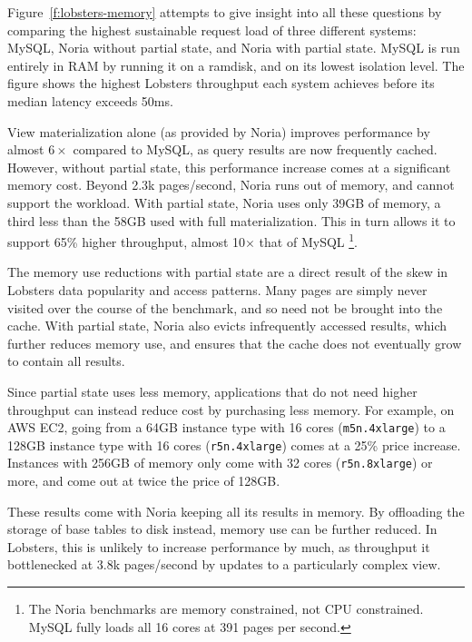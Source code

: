 Figure~\ref{f:lobsters-memory} attempts to give insight into all these questions
by comparing the highest sustainable request load of three different systems:
MySQL, Noria without partial state, and Noria with partial state. MySQL is run
entirely in RAM by running it on a ramdisk, and on its lowest isolation level.
The figure shows the highest Lobsters throughput each system achieves before its
median latency exceeds 50ms.

View materialization alone (as provided by Noria) improves performance by almost
$6\times$ compared to MySQL, as query results are now frequently cached.
However, without partial state, this performance increase comes at a significant
memory cost. Beyond 2.3k pages/second, Noria runs out of memory, and cannot
support the workload. With partial state, Noria uses only 39GB of memory, a
third less than the 58GB used with full materialization. This in turn allows it
to support 65\% higher throughput, almost 10$\times$ that of MySQL%
\footnote{The Noria benchmarks are memory constrained, not CPU constrained.
MySQL fully loads all 16 cores at 391 pages per second.}.

The memory use reductions with partial state are a direct result of the skew in
Lobsters data popularity and access patterns. Many pages are simply never
visited over the course of the benchmark, and so need not be brought into the
cache. With partial state, Noria also evicts infrequently accessed results,
which further reduces memory use, and ensures that the cache does not eventually
grow to contain all results.

Since partial state uses less memory, applications that do not need higher
throughput can instead reduce cost by purchasing less memory. For example, on
AWS EC2, going from a 64GB instance type with 16 cores (\texttt{m5n.4xlarge}) to
a 128GB instance type with 16 cores (\texttt{r5n.4xlarge}) comes at a 25\% price
increase. Instances with 256GB of memory only come with 32 cores
(\texttt{r5n.8xlarge}) or more, and come out at twice the price of 128GB.

\begin{inprogress}
  These results come with Noria keeping all its results in memory. By offloading
  the storage of base tables to disk instead, memory use can be further reduced.
  In Lobsters, this is unlikely to increase performance by much, as throughput
  it bottlenecked at 3.8k pages/second by updates to a particularly complex
  view.
\end{inprogress}

